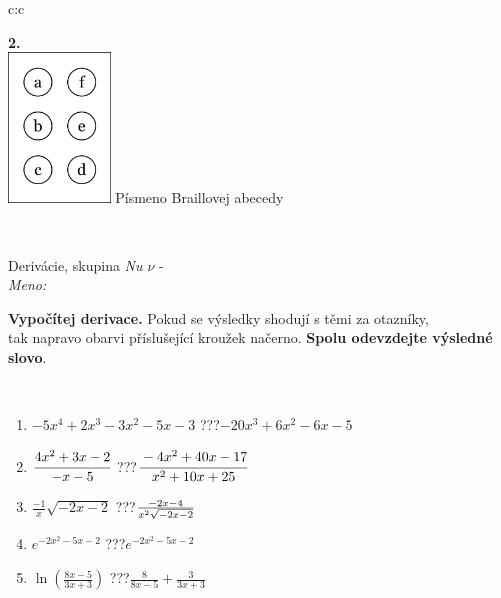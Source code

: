 \documentclass[10pt]{report}
\begin{document}
\begin{tabular}{c:c}
\begin{minipage}[c][104.5mm][t]{0.5\linewidth}
\begin{center}
\begin{minipage}{0.20\linewidth}
\begin{center}
{\Huge\bfseries 2.} \\[2mm]
\includegraphics[height=40mm]{../images/braille.png}
{\small Písmeno Braillovej abecedy}
\end{center}
\end{minipage}
\end{center}
\end{minipage}
\\ \hdashline
\begin{minipage}[c][104.5mm][t]{0.5\linewidth}
\begin{center}
\vspace{7mm}
{\huge Derivácie, skupina \textit{Nu $\nu$} -}\\[5mm]
\textit{Meno:}\phantom{xxxxxxxxxxxxxxxxxxxxxxxxxxxxxxxxxxxxxxxxxxxxxxxxxxxxxxxxxxxxxxxxx}\\[5mm]
\begin{minipage}{0.95\linewidth}
\begin{center}
\textbf{Vypočítej derivace.} Pokud se výsledky shodují s těmi za otazníky,\\tak napravo obarvi příslušející kroužek načerno. \textbf{Spolu odevzdejte výsledné slovo}.
\end{center}
\end{minipage}
\\[1mm]
\begin{minipage}{0.79\linewidth}
\begin{center}
\begin{varwidth}{\linewidth}
\begin{enumerate}
\normalsize
\item $-5x^4+2x^3-3x^2-5x-3$\quad \dotfill\; ???\;\dotfill \quad $-20x^3+6x^2-6x-5$
\item $\cfrac{4x^2+3x-2}{-x-5}$\quad \dotfill\; ???\;\dotfill \quad $\cfrac{-4x^2+40x-17}{x^2+10x+25}$
\item $\frac{-1}{x}\sqrt{-2x-2}$\quad \dotfill\; ???\;\dotfill \quad $\frac{-2x-4}{x^2 \sqrt{\smash[b]{-2x-2}}}$
\item $e^{-2x^2-5x-2}$\quad \dotfill\; ???\;\dotfill \quad $e^{-2x^2-5x-2}$
\item $\ln{\left(\frac{8x-5}{3x+3}\right)}$\quad \dotfill\; ???\;\dotfill \quad $\frac{8}{8x-5}+\frac{3}{3x+3}$

\end{enumerate}
\end{varwidth}
\end{center}
\end{minipage}
\end{center}
\end{minipage}
\end{tabular}
\end{document}
